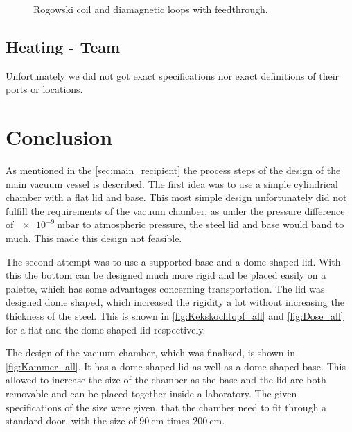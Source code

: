 \begin{figure}[H]
\begin{subfigure}{0.49\textwidth}
        \label{fig:rogowski_coil_diamagnetic_loops}
    \end{subfigure}
    \caption{Rogowski coil and diamagnetic loops with feedthrough.}
\end{figure}




\subsection{Heating - Team}
%
Unfortunately we did not got exact specifications nor exact definitions of their ports or locations.



\section{Conclusion}

As mentioned in the \autoref{sec:main_recipient} the process steps of the design of the main vacuum vessel is described.
The first idea was to use a simple cylindrical chamber with a flat lid and base.
This most simple design unfortunately did not fulfill the requirements of the vacuum chamber, as under the pressure difference of $\SI{e-9}{\milli\bar}$ to atmospheric pressure, the steel lid and base would band to much.
This made this design not feasible.

The second attempt was to use a supported base and a dome shaped lid.
With this the bottom can be designed much more rigid and be placed easily on a palette, which has some advantages concerning transportation.
The lid was designed dome shaped, which increased the rigidity a lot without increasing the thickness of the steel.
This is shown in \autoref{fig:Kekskochtopf_all} and \autoref{fig:Dose_all} for a flat and the dome shaped lid respectively.

The design of the vacuum chamber, which was finalized, is shown in \autoref{fig:Kammer_all}.
It has a dome shaped lid as well as a dome shaped base.
This allowed to increase the size of the chamber as the base and the lid are both removable and can be placed together inside a laboratory.
The given specifications of the size were given, that the chamber need to fit through a standard door, with the size of $\SI{90}{\centi\meter}$ times $\SI{200}{\centi\meter}$.

